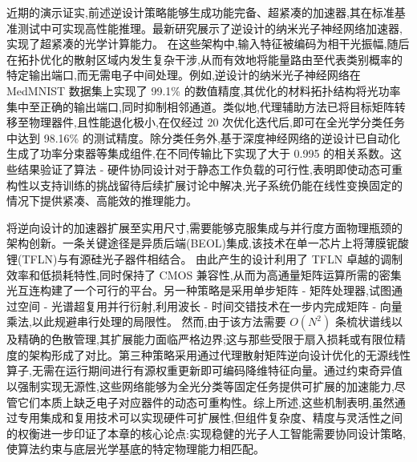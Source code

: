近期的演示证实,前述逆设计策略能够生成功能完备、超紧凑的加速器,其在标准基准测试中可实现高性能推理。最新研究展示了逆设计的纳米光子神经网络加速器,实现了超紧凑的光学计算能力。\citep{doi_10_1038_s41467_026_68648_1_26658a9c} 在这些架构中,输入特征被编码为相干光振幅,随后在拓扑优化的散射区域内发生复杂干涉,从而有效地将能量路由至代表类别概率的特定输出端口,而无需电子中间处理。例如,逆设计的纳米光子神经网络在 MedMNIST 数据集上实现了 99.1\% 的数值精度,其优化的材料拓扑结构将光功率集中至正确的输出端口,同时抑制相邻通道。类似地,代理辅助方法已将目标矩阵转移至物理器件,且性能退化极小,在仅经过 20 次优化迭代后,即可在全光学分类任务中达到 98.16\% 的测试精度。除分类任务外,基于深度神经网络的逆设计已自动化生成了功率分束器等集成组件,在不同传输比下实现了大于 0.995 的相关系数。这些结果验证了算法 - 硬件协同设计对于静态工作负载的可行性,表明即使动态可重构性以支持训练的挑战留待后续扩展讨论中解决,光子系统仍能在线性变换固定的情况下提供紧凑、高能效的推理能力。\citep{doi_10_1038_s41467_026_68648_1_26658a9c} \citep{s2_753a5d83a96e0194da93bcb6f20fa0bd356e37fa_c11e3796} \citep{s2_0482241c1bd933adb55a6674133d1688626bdab1_17e7627d}

将逆向设计的加速器扩展至实用尺寸,需要能够克服集成与并行度方面物理瓶颈的架构创新。一条关键途径是异质后端(BEOL)集成,该技术在单一芯片上将薄膜铌酸锂(TFLN)与有源硅光子器件相结合。\citep{s2_9b444e84d20ae6e3d62d2d4df30268b5a53baad2_40af2cc9} 由此产生的设计利用了 TFLN 卓越的调制效率和低损耗特性,同时保持了 CMOS 兼容性,从而为高通量矩阵运算所需的密集光互连构建了一个可行的平台。另一种策略是采用单步矩阵 - 矩阵处理器,试图通过空间 - 光谱超复用并行衍射,利用波长 - 时间交错技术在一步内完成矩阵 - 向量乘法,以此规避串行处理的局限性。\citep{doi_10_1038_s41467_026_68452_x_bafa2de0} 然而,由于该方法需要 \(O(N^{2})\) 条梳状谱线以及精确的色散管理,其扩展能力面临严格边界;这与那些受限于扇入损耗或有限位精度的架构形成了对比。第三种策略采用通过代理散射矩阵逆向设计优化的无源线性算子,无需在运行期间进行有源权重更新即可编码降维特征向量。通过约束奇异值以强制实现无源性,这些网络能够为全光分类等固定任务提供可扩展的加速能力,尽管它们本质上缺乏电子对应器件的动态可重构性。综上所述,这些机制表明,虽然通过专用集成和复用技术可以实现硬件可扩展性,但组件复杂度、精度与灵活性之间的权衡进一步印证了本章的核心论点:实现稳健的光子人工智能需要协同设计策略,使算法约束与底层光学基底的特定物理能力相匹配。\citep{s2_9b444e84d20ae6e3d62d2d4df30268b5a53baad2_40af2cc9} \citep{doi_10_1038_s41467_026_68452_x_bafa2de0} \citep{s2_753a5d83a96e0194da93bcb6f20fa0bd356e37fa_c11e3796}

